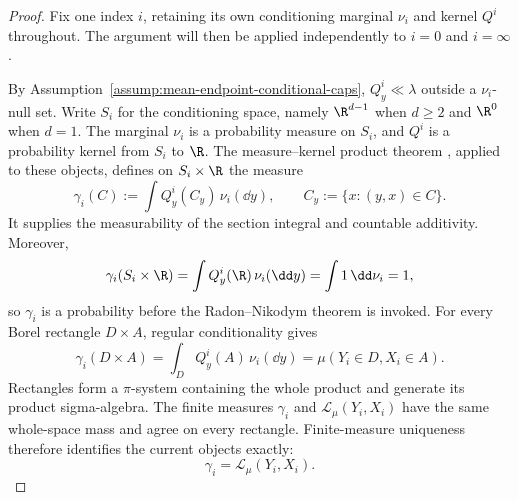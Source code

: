 \begin{proof}
Fix one index $i$, retaining its own conditioning marginal $\nu_i$ and
kernel $Q^i$ throughout.  The argument will then be applied independently to
$i=0$ and $i=\infty$.

By Assumption~\ref{assump:mean-endpoint-conditional-caps}, $Q^i_y\ll\lambda$
outside a $\nu_i$-null set.  Write $S_i$ for the conditioning space, namely
$\R^{d-1}$ when $d\geq2$ and $\R^0$ when $d=1$.  The marginal $\nu_i$ is a
probability measure on $S_i$, and $Q^i$ is a probability kernel from $S_i$
to $\R$.  The measure--kernel product theorem
\citep[Chapter~1]{Kallenberg2002}, applied to these objects, defines on
$S_i\times\R$ the measure
\[
\gamma_i(C):=\int Q^i_y(C_y)\,\nu_i(\dd y),
\qquad C_y:=\{x:(y,x)\in C\}.
\]
It supplies the measurability of the section integral and countable
additivity.  Moreover,
\[
\gamma_i(S_i\times\R)
=\int Q^i_y(\R)\,\nu_i(\dd y)=\int1\,\dd\nu_i=1,
\]
so $\gamma_i$ is a probability before the Radon--Nikodym theorem is invoked.
For every Borel rectangle $D\times A$, regular conditionality gives
\[
\gamma_i(D\times A)
=\int_D Q^i_y(A)\,\nu_i(\dd y)
=\mu(Y_i\in D,X_i\in A).
\]
Rectangles form a $\pi$-system containing the whole product and generate its
product sigma-algebra.  The finite measures $\gamma_i$ and
$\mathcal L_\mu(Y_i,X_i)$ have the same whole-space mass and agree on every
rectangle.  Finite-measure uniqueness therefore identifies the current
objects exactly:
\[
\gamma_i=\mathcal L_\mu(Y_i,X_i).
\]


\end{proof}
